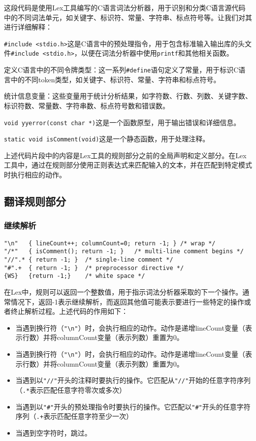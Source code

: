 \documentclass[lang=cn,11pt,a4paper]{elegantpaper}
\begin{document}
这段代码是使用Lex工具编写的C语言词法分析器，用于识别和分类C语言源代码中的不同词法单元，如关键字、标识符、常量、字符串、标点符号等。让我们对其进行详细解释：


\lstinline{#include <stdio.h>}这是C语言中的预处理指令，用于包含标准输入输出库的头文件\lstinline{#include <stdio.h>}，以便在词法分析器中使用\lstinline{printf}和其他相关函数。

定义C语言中的不同令牌类型：这一系列\lstinline{#define}语句定义了常量，用于标识C语言中的不同token类型，如关键字、标识符、常量、字符串和标点符号。

统计信息变量：这些变量用于统计分析结果，如字符数、行数、列数、关键字数、标识符数、常量数、字符串数、标点符号数和错误数。

\lstinline{void yyerror(const char *)}这是一个函数原型，用于输出错误和详细信息。

\lstinline{static void isComment(void)}这是一个静态函数，用于处理注释。

上述代码片段中的内容是Lex工具的规则部分之前的全局声明和定义部分。在Lex工具中，通过在规则部分使用正则表达式来匹配输入的文本，并在匹配到特定模式时执行相应的动作。

\subsection{翻译规则部分}

\subsubsection{继续解析}
\begin{lstlisting}
"\n"   { lineCount++; columnCount=0; return -1; } /* wrap */
"/*"   { isComment(); return -1; }   /* multi-line comment begins */
"//".* { return -1; }  /* single-line comment */
"#".+  { return -1; }  /* preprocessor directive */
{WS}   {return -1;}    /* white space */
\end{lstlisting}

在Lex中，规则可以返回一个整数值，用于指示词法分析器采取的下一个操作。通常情况下，返回-1表示继续解析，而返回其他值可能表示要进行一些特定的操作或者终止解析过程。上述代码的作用如下：
\begin{itemize}
    \item 当遇到换行符（\lstinline{"\n"}）时，会执行相应的动作。动作是递增lineCount变量（表示行数）并将columnCount变量（表示列数）重置为0。
    \item 当遇到换行符（\lstinline{"\n"}）时，会执行相应的动作。动作是递增lineCount变量（表示行数）并将columnCount变量（表示列数）重置为0。
    \item 当遇到以\lstinline{"//"}开头的注释时要执行的操作。它匹配从\lstinline{"//"}开始的任意字符序列（\lstinline{.*}表示匹配任意字符零次或多次）
    \item 当遇到以\lstinline{"#"}开头的预处理指令时要执行的操作。它匹配以\lstinline{"#"}开头的任意字符序列（\lstinline{.+}表示匹配任意字符至少一次）
    \item 当遇到空字符时，跳过。
\end{itemize}
\end{document}
